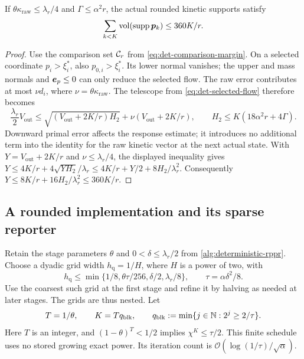 \begin{lemma}
\label{lem:bounded-kinetic-volume}
If $\theta\kappa_{\mathrm{raw}}\leq\lambda_r/4$ and
$\Gamma\leq\alpha^2r$, the actual rounded kinetic supports satisfy
\begin{equation}
 \sum_{k<K}\operatorname{vol}(\operatorname{supp}\bm{p}_k)\leq360K/r.
 \label{eq:bounded-kinetic-volume}
\end{equation}
\end{lemma}
\begin{proof}
Use the comparison set $\mathcal{C}_r$ from \cref{eq:det-comparison-margin}.
On a selected coordinate $p_i>\xi_i^*$, also $p_{0,i}>\xi_i^*$.
Its lower normal vanishes; the upper and mass normals and $\bm{e}_p\leq0$
can only reduce the selected flow. The raw error contributes at most
$\nu d_i$, where $\nu=\theta\kappa_{\mathrm{raw}}$.
The telescope from \cref{eq:det-selected-flow} therefore becomes
\begin{equation*}
 \frac{\lambda_r}2 V_{\mathrm{out}}
 \leq\sqrt{(V_{\mathrm{out}}+2K/r)H_2}
          +\nu(V_{\mathrm{out}}+2K/r),
 \qquad H_2\leq K(18\alpha^2r+4\Gamma).
\end{equation*}
Downward primal error affects the response estimate; it introduces no
additional term into the identity for the raw kinetic vector at the next
actual state. With $Y=V_{\mathrm{out}}+2K/r$ and $\nu\leq\lambda_r/4$,
the displayed inequality gives
$Y\leq4K/r+4\sqrt{YH_2}/\lambda_r
 \leq4K/r+Y/2+8H_2/\lambda_r^2$.
Consequently $Y\leq8K/r+16H_2/\lambda_r^2\leq360K/r$.
\end{proof}

\subsection{A rounded implementation and its sparse reporter}

Retain the stage parameters $\theta$ and $0<\delta\leq\lambda_r/2$ from
\cref{alg:deterministic-rppr}. Choose a dyadic grid width
$h_{\mathrm{q}}=1/H$, where $H$ is a power of two,
with
\begin{equation*}
 h_{\mathrm{q}}\leq
 \min\{1/8,\theta\tau/256,\delta/2,\lambda_r/8\},
 \qquad \tau=\alpha\delta^2/8.
\end{equation*}
Use the coarsest such grid at the first stage and refine it by halving as
needed at later stages. The grids are thus nested. Let
\begin{equation*}
 T=1/\theta,\qquad K=Tq_{\mathrm{blk}},\qquad
 q_{\mathrm{blk}}:=\min\{j\in\mathbb{N}:2^j\geq2/\tau\}.
\end{equation*}
Here $T$ is an integer, and $(1-\theta)^T<1/2$ implies
$\chi^K\leq\tau/2$. This finite schedule uses no stored growing exact
power. Its iteration count is $\mathcal{O}(\log(1/\tau)/\sqrt\alpha)$.

